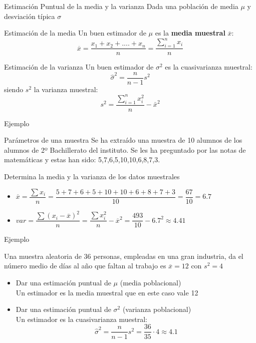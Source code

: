 \documentclass[11pt,handout]{beamer}
\begin{document}
\begin{frame}{Estimación Puntual de la media y la varianza}
Dada una población de media $\mu$ y desviación típica $\sigma$
\begin{block}{Estimación de la media}
 Un buen estimador de $\mu$ es la \textbf{media muestral} $\overline{x}$:
$$\overline{x}= \frac{x_1 + x_2 + ....+x_n} {n}=\frac{{\sum_{i=1}^n x_i }}{n}$$
\end{block}
\pause
\begin{block}{Estimación de la varianza}
Un buen estimador de $\sigma^2$ es la cuasivarianza muestral:
$$\widehat{\sigma}^2=\frac{n}{n-1}s^2$$
siendo $s^2$ la varianza muestral:
$$s^2=\frac{\sum_{i=1}^n x_i^2 }{n} - \bar x^2$$
\end{block}
\end{frame}

\begin{frame}{Ejemplo}
   
    \begin{block}{Parámetros de una muestra} Se ha extraído una muestra de 10 alumnos de los alumnos de 2º Bachillerato del instituto. Se les ha preguntado por las notas de matemáticas y estas han sido:  5,7,6,5,10,10,6,8,7,3.
    
    Determina la media y la varianza de los datos muestrales
    
    \end{block}
\begin{itemize}
\item $\overline{x}=\dfrac{\sum x_i}{n}=\dfrac{5+7+6+5+10+10+6+8+7+3}{10}=\dfrac{67}{10}=6.7$
\item $var=\dfrac{\sum (x_i - \overline{x})^2}{n}=\dfrac{\sum x_i^2}{n}-\overline{x}^2=\dfrac{493}{10}-6.7^2\approx4.41$
\end{itemize}    
    
\end{frame}

\begin{frame}{Ejemplo}
\begin{block}{}
Una muestra aleatoria de 36 personas, empleadas en una gran industria, da el número medio de días al año que faltan al trabajo es $\overline{x} = 12$ con $s^2 = 4$
\end{block}

\begin{itemize}[<+->]
    \item Dar una estimación puntual de $\mu$ (media poblacional)
    \pause 
    \\ Un estimador es la media muestral que en este caso vale 12
    \item Dar una estimación puntual de $\sigma^2$ (varianza poblacional)
    \pause 
    \\ Un estimador es la cuasivarianza muestral:
    $$\widehat{\sigma}^2=\frac{n}{n-1}s^2=\frac{36}{35}\cdot 4\approx 4.1$$
\end{itemize}

\end{frame}
\end{document}

